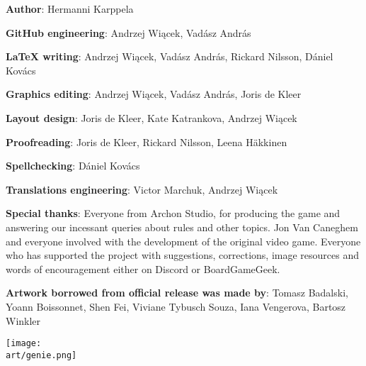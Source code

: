 
\bigbreak

\begin{multicols*}{2}

\textbf{Author}: Hermanni Karppela

\textbf{GitHub engineering}: Andrzej Wiącek, Vadász András

\textbf{LaTeX writing}: Andrzej Wiącek, Vadász András, Rickard Nilsson, Dániel Kovács

\textbf{Graphics editing}: Andrzej Wiącek, Vadász András, Joris de Kleer

\textbf{Layout design}: Joris de Kleer, Kate Katrankova, Andrzej Wiącek

\textbf{Proofreading}: Joris de Kleer, Rickard Nilsson, Leena Häkkinen

\textbf{Spellchecking}: Dániel Kovács

\textbf{Translations engineering}: Victor Marchuk, Andrzej Wiącek

\textbf{Special thanks}: Everyone from Archon Studio, for producing the game and answering our incessant queries about rules and other topics.
Jon Van Caneghem and everyone involved with the development of the original video game.
Everyone who has supported the project with suggestions, corrections, image resources and words of encouragement either on Discord or BoardGameGeek.

\textbf{Artwork borrowed from official release was made by}: Tomasz Badalski, Yoann Boissonnet, Shen Fei, Viviane Tybusch Souza, Iana Vengerova, Bartosz Winkler

\columnbreak

\vspace*{\fill}

\texttt{[image: \\art/genie.png]}

\vspace*{\fill}

\end{multicols*}
